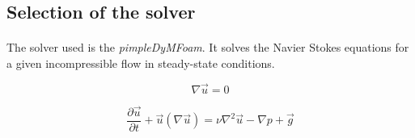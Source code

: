 \subsection{Selection of the solver}

\paragraph{}The solver used is the \textit{pimpleDyMFoam}. It solves the Navier Stokes equations for a given incompressible flow in steady-state conditions.

\begin{equation}
\nabla \vec{u} = 0
\end{equation}

\begin{equation}
\frac{\partial \vec{u}}{\partial t} + \vec{u} (\nabla \vec{u}) = \nu \nabla^2 \vec{u} - \nabla p + \vec{g}
\end{equation}

\paragraph{}
